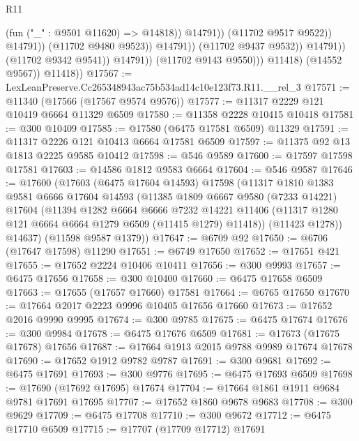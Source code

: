 \begin{lexlean}{R11}
\begin{coremodule}
                                              (fun ("_" : @9501 @11620) => @14818))
                                            @14791))
                                        (@11702 @9517 @9522))
                                      @14791))
                                  (@11702 @9480 @9523))
                                @14791))
                            (@11702 @9437 @9532))
                          @14791))
                      (@11702 @9342 @9541))
                    @14791))
                (@11702 @9143 @9550)))
            @11418)
          (@14552 @9567))
        @11418))
@17567 := LexLeanPreserve.Cc265348943ac75b534ad14c10e123f73.R11.__rel_3
@17571 := @11340 (@17566 (@17567 @9574 @9576))
@17577 := @11317 @2229 @121 @10419 @6664 @11329 @6509
@17580 := @11358 @2228 @10415 @10418
@17581 := @300 @10409
@17585 := @17580 (@6475 @17581 @6509) @11329
@17591 := @11317 @2226 @121 @10413 @6664 @17581 @6509
@17597 := @11375 @92 @13 @1813 @2225 @9585 @10412
@17598 := @546 @9589
@17600 := @17597 @17598 @17581
@17603 := @14586 @1812 @9583 @6664
@17604 := @546 @9587
@17646 := @17600
    (@17603
      (@6475 @17604 @14593)
      @17598
      (@11317
        @1810
        @1383
        @9581
        @6666
        @17604
        @14593
        (@11385
          @1809
          @6667
          @9580
          (@7233 @14221)
          @17604
          (@11394
            @1282
            @6664
            @6666
            @7232
            @14221
            @11406
            (@11317 @1280 @121 @6664 @6664 @1279 @6509 (@11415 @1279) @11418))
          (@11423 @1278))
        @14637)
      (@11598 @9587 @1379))
@17647 := @6709 @92
@17650 := @6706 (@17647 @17598) @11290
@17651 := @6749 @17650
@17652 := @17651 @421
@17655 := @17652 @2224 @10406 @10411
@17656 := @300 @9993
@17657 := @6475 @17656
@17658 := @300 @10400
@17660 := @6475 @17658 @6509
@17663 := @17655 (@17657 @17660) @17581
@17664 := @6765 @17650
@17670 := @17664 @2017 @2223 @9996 @10405 @17656 @17660
@17673 := @17652 @2016 @9990 @9995
@17674 := @300 @9785
@17675 := @6475 @17674
@17676 := @300 @9984
@17678 := @6475 @17676 @6509
@17681 := @17673 (@17675 @17678) @17656
@17687 := @17664 @1913 @2015 @9788 @9989 @17674 @17678
@17690 := @17652 @1912 @9782 @9787
@17691 := @300 @9681
@17692 := @6475 @17691
@17693 := @300 @9776
@17695 := @6475 @17693 @6509
@17698 := @17690 (@17692 @17695) @17674
@17704 := @17664 @1861 @1911 @9684 @9781 @17691 @17695
@17707 := @17652 @1860 @9678 @9683
@17708 := @300 @9629
@17709 := @6475 @17708
@17710 := @300 @9672
@17712 := @6475 @17710 @6509
@17715 := @17707 (@17709 @17712) @17691

\end{coremodule}
\end{lexlean}
